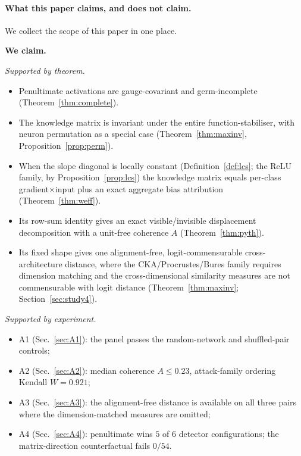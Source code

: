 \paragraph{What this paper claims, and does not claim.}
We collect the scope of this paper in one place.

\begin{tcolorbox}[breakable, colback=white, colframe=black, boxrule=0.4pt, sharp corners]
\textbf{We claim.}

\smallskip
\emph{Supported by theorem.}
\begin{itemize}
\item Penultimate activations are gauge-covariant and germ-incomplete
(Theorem~\ref{thm:complete}).
\item The knowledge matrix is invariant under the entire
function-stabiliser, with neuron permutation as a special case
(Theorem~\ref{thm:maxinv}, Proposition~\ref{prop:perm}).
\item When the slope diagonal is locally constant (Definition~\ref{def:lcs};
the ReLU family, by Proposition~\ref{prop:lcs}) the knowledge matrix equals
per-class gradient$\times$input plus an exact aggregate bias attribution
(Theorem~\ref{thm:weff}).
\item Its row-sum identity gives an exact visible/invisible displacement
decomposition with a unit-free coherence $A$
(Theorem~\ref{thm:pyth}).
\item Its fixed shape gives one alignment-free, logit-commensurable
cross-architecture distance, where the CKA/Procrustes/Bures family requires
dimension matching and the cross-dimensional similarity measures are not
commensurable with logit distance
(Theorem~\ref{thm:maxinv}; Section~\ref{sec:study4}).
\end{itemize}

\smallskip
\emph{Supported by experiment.}
\begin{itemize}
\item A1 (Sec.~\ref{sec:A1}): the panel passes the random-network and shuffled-pair controls;
\item A2 (Sec.~\ref{sec:A2}): median coherence $A\le 0.23$, attack-family ordering Kendall
$W=0.921$;
\item A3 (Sec.~\ref{sec:A3}): the alignment-free distance is available on all three pairs
where the dimension-matched measures are omitted;
\item A4 (Sec.~\ref{sec:A4}): penultimate wins $5$ of $6$ detector configurations; the
matrix-direction counterfactual fails $0/54$.
\end{itemize}


\end{tcolorbox}
